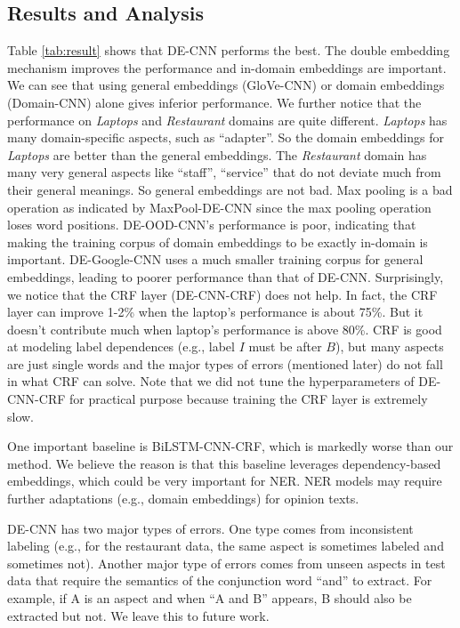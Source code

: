 \documentclass[11pt,a4paper]{article}
\begin{document}
\subsection{Results and Analysis}
Table \ref{tab:result} shows that DE-CNN performs the best. 
The double embedding mechanism improves the performance and in-domain embeddings are important. 
We can see that using general embeddings (GloVe-CNN) or domain embeddings (Domain-CNN) alone gives inferior performance. 
We further notice that the performance on \textit{Laptops} and \textit{Restaurant} domains are quite different. 
\textit{Laptops} has many domain-specific aspects, such as ``adapter''. 
So the domain embeddings for \textit{Laptops} are better than the general embeddings. 
The \textit{Restaurant} domain has many very general aspects like ``staff'', ``service'' that do not deviate much from their general meanings. 
So general embeddings are not bad. 
Max pooling is a bad operation as indicated by MaxPool-DE-CNN since the max pooling operation loses word positions.
DE-OOD-CNN's performance is poor, indicating that making the training corpus of domain embeddings to be exactly in-domain is important.
DE-Google-CNN uses a much smaller training corpus for general embeddings, leading to poorer performance than that of DE-CNN.
Surprisingly, we notice that the CRF layer (DE-CNN-CRF) does not help.
In fact, the CRF layer can improve 1-2\% when the laptop's performance is about 75\%.
But it doesn't contribute much when laptop's performance is above 80\%. 
CRF is good at modeling label dependences (e.g., label $I$ must be after $B$), but many aspects are just single words and the major types of errors (mentioned later) do not fall in what CRF can solve.
Note that we did not tune the hyperparameters of DE-CNN-CRF for practical purpose because training the CRF layer is extremely slow. 

One important baseline is BiLSTM-CNN-CRF, which is markedly worse than our method. 
We believe the reason is that this baseline leverages dependency-based embeddings\cite{levy2014dependency}, 
which could be very important for NER.
NER models may require further adaptations (e.g., domain embeddings) for opinion texts. 

DE-CNN has two major types of errors.
One type comes from inconsistent labeling (e.g., for the restaurant data, the same aspect is sometimes labeled and sometimes not). 
Another major type of errors comes from unseen aspects in test data that require the semantics of the conjunction word ``and'' to extract. For example, if A is an aspect and when ``A and B'' appears, B should also be extracted but not.
We leave this to future work.
\end{document}
